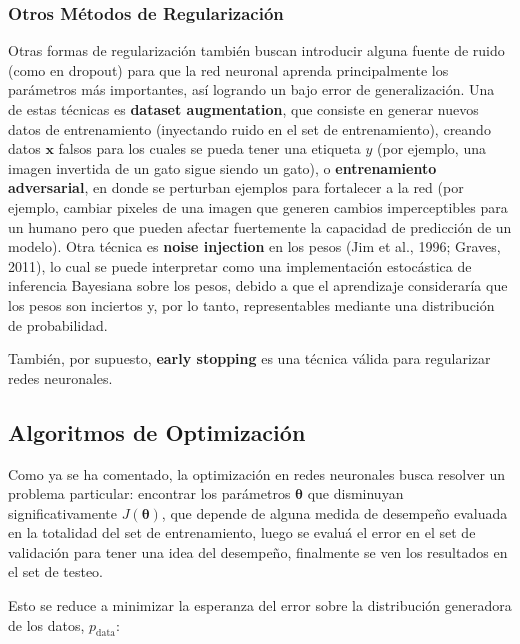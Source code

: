 \subsubsection{Otros M\'etodos de Regularizaci\'on}
Otras formas de regularizaci\'on tambi\'en buscan introducir alguna fuente de ruido (como en dropout) para que la red neuronal aprenda principalmente los par\'ametros m\'as importantes, as\'i logrando un bajo error de generalizaci\'on. Una de estas t\'ecnicas es \textbf{dataset augmentation}, que consiste en generar nuevos datos de entrenamiento (inyectando ruido en el set de entrenamiento), creando datos $\bm{x}$ falsos para los cuales se pueda tener una etiqueta $y$ (por ejemplo, una imagen invertida de un gato sigue siendo un gato), o \textbf{entrenamiento adversarial}, en donde se perturban ejemplos para fortalecer a la red (por ejemplo, cambiar pixeles de una imagen que generen cambios imperceptibles para un humano pero que pueden afectar fuertemente la capacidad de predicci\'on de un modelo). Otra t\'ecnica es \textbf{noise injection} en los pesos (Jim et al., 1996; Graves, 2011), lo cual se puede interpretar como una implementaci\'on estoc\'astica de inferencia Bayesiana sobre los pesos, debido a que el aprendizaje considerar\'ia que los pesos son inciertos y, por lo tanto, representables mediante una distribuci\'on de probabilidad.

Tambi\'en, por supuesto, \textbf{early stopping} es una t\'ecnica v\'alida para regularizar redes neuronales.

\subsection{Algoritmos de Optimizaci\'on}

Como ya se ha comentado, la optimizaci\'on en redes neuronales busca resolver un problema particular: encontrar los par\'ametros $\bm{\theta}$ que disminuyan significativamente $J(\bm{\theta})$, que depende de alguna medida de desempe{\~{n}}o evaluada en la totalidad del set de entrenamiento, luego se evaluá el error en el set de validaci\'on para tener una idea del desempeño, finalmente se ven los resultados en el set de testeo. 

Esto se reduce a minimizar la esperanza del error sobre la distribuci\'on generadora de los datos, $p_{\textrm{data}}$:


